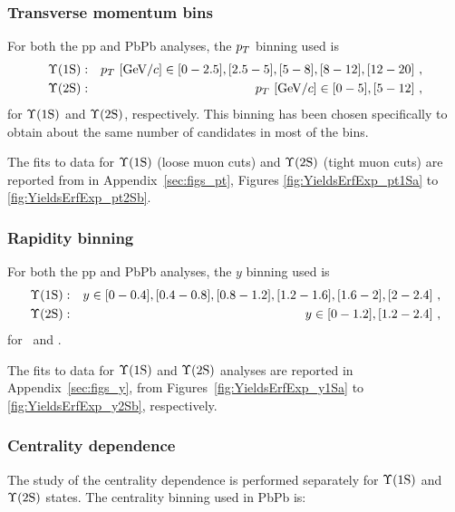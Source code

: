 \subsubsection{Transverse momentum bins}
\label{binning}
\label{subsec:ptbins}
  For both the pp and PbPb analyses, the $p_{T}$ binning used is
  \begin{eqnarray}
  \Upsilon\mathrm{(1S)}:&& p_{T}~[{\rm GeV}/c] \in [0 - 2.5], [2.5 - 5], [5 - 8],[8 -  12], [12 - 20] \ ,\nonumber  \\
  \Upsilon\mathrm{(2S)}:&& p_{T}~[{\rm GeV}/c] \in [0 - 5], [5 - 12] \nonumber \ ,
\end{eqnarray}
for  $\Upsilon\mathrm{(1S)}$ and  
$\Upsilon\mathrm{(2S)}$, respectively. This binning has been chosen specifically to
obtain about the same number of candidates in most of the bins. %

The fits to data for $\Upsilon\mathrm{(1S)}$ (loose muon cuts) and $\Upsilon\mathrm{(2S)}$ (tight muon cuts) %
are reported from in Appendix~\ref{sec:figs_pt}, Figures \ref{fig:YieldsErfExp_pt1Sa} to \ref{fig:YieldsErfExp_pt2Sb}.


\subsubsection{Rapidity binning}
\label{subsec:rapbins}
For both the pp and PbPb analyses, the  $y$ binning used is
%
 \begin{eqnarray}
  \Upsilon\mathrm{(1S)}:&& y \in [0 - 0.4], [0.4 - 0.8], [0.8 - 1.2], [1.2 - 1.6], [1.6 - 2], [2 - 2.4] \ ,
  \nonumber  \\
    \Upsilon\mathrm{(2S)}:&& y \in [0 - 1.2], [1.2 - 2.4] \nonumber \ ,
\end{eqnarray}
for \PgUa\ and \PgUb. %
%

The fits to data for $\Upsilon\mathrm{(1S)}$ and $\Upsilon\mathrm{(2S)}$ analyses are reported
in Appendix~\ref{sec:figs_y}, from Figures~\ref{fig:YieldsErfExp_y1Sa} to \ref{fig:YieldsErfExp_y2Sb}, respectively. 


% 
%
\vfill\newpage
\subsubsection{Centrality dependence}
\label{subsec:centbins}
The study of the centrality dependence is performed separately for  $\Upsilon\mathrm{(1S)}$ and $\Upsilon\mathrm{(2S)}$ states.%
The centrality binning used in PbPb is:

